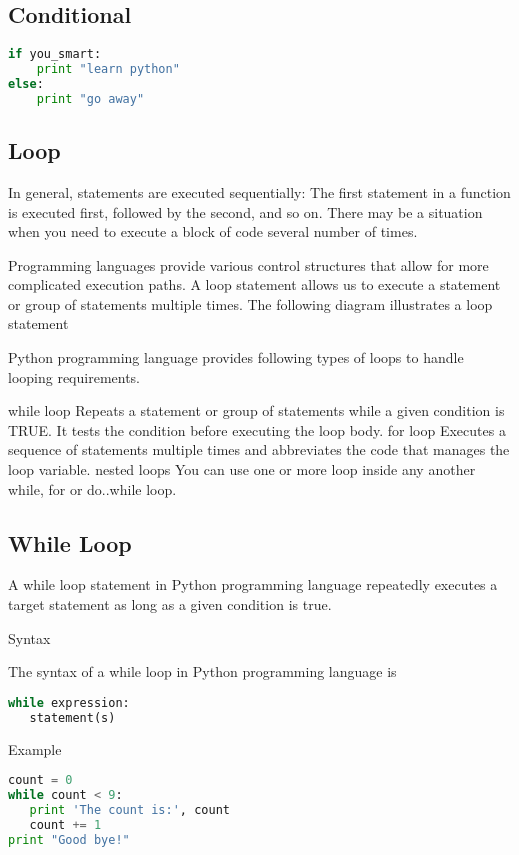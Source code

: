 \subsection{Conditional}

\begin{lstlisting}[language=Python]
if you_smart:
    print "learn python"
else:
    print "go away"
\end{lstlisting}

\subsection{Loop}

In general, statements are executed sequentially: The first statement in a function is executed first, followed by the second, and so on. There may be a situation when you need to execute a block of code several number of times.

Programming languages provide various control structures that allow for more complicated execution paths. A loop statement allows us to execute a statement or group of statements multiple times. The following diagram illustrates a loop statement


Python programming language provides following types of loops to handle looping requirements.

while loop	Repeats a statement or group of statements while a given condition is TRUE. It tests the condition before executing the loop body.
for loop	Executes a sequence of statements multiple times and abbreviates the code that manages the loop variable.
nested loops	You can use one or more loop inside any another while, for or do..while loop.

\subsection{While Loop}

A while loop statement in Python programming language repeatedly executes a target statement as long as a given condition is true.

Syntax

The syntax of a while loop in Python programming language is

\begin{lstlisting}[language=Python]
while expression:
   statement(s)
\end{lstlisting}

Example

\begin{lstlisting}[language=Python]
count = 0
while count < 9:
   print 'The count is:', count
   count += 1
print "Good bye!"
\end{lstlisting}


